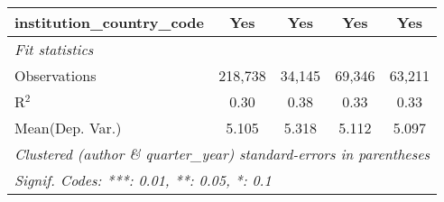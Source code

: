 \begin{tabular}{lcccc}
   institution\_country\_code   & Yes         & Yes           & Yes     & Yes\\  
   \midrule
   \emph{Fit statistics}\\
   Observations                 & 218,738     & 34,145        & 69,346  & 63,211\\  
   R$^2$                        & 0.30        & 0.38          & 0.33    & 0.33\\  
Mean(Dep. Var.) & 5.105 & 5.318 & 5.112 & 5.097 \\
   \midrule \midrule
   \multicolumn{5}{l}{\emph{Clustered (author \& quarter\_year) standard-errors in parentheses}}\\
   \multicolumn{5}{l}{\emph{Signif. Codes: ***: 0.01, **: 0.05, *: 0.1}}\\
\end{tabular}
\par\endgroup
